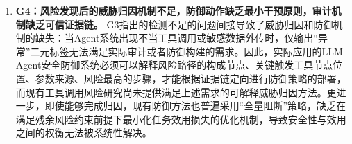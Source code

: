 \begin{enumerate}
  \item \textbf{G4：风险发现后的威胁归因机制不足，防御动作缺乏最小干预原则，审计机制缺乏可信证据链。}
  G3指出的检测不足的问题间接导致了威胁归因和防御机制的缺失：当Agent系统出现不当工具调用或敏感数据外传时，仅输出“异常”二元标签无法满足实际审计或者防御构建的需求。因此，实际应用的LLM Agent安全防御系统必须可以解释风险路径的构成节点、关键触发工具节点位置、参数来源、风险最高的步骤，才能根据证据链定向进行防御策略的部署，而现有工具调用风险研究\cite{he2025sentinelagent,wang2026authgraph,wang2026agenttrace,li2026traces}尚未提供满足上述需求的可解释威胁归因方法。更进一步，即使能够完成归因，现有防御方法也普遍采用“全量阻断”策略，缺乏在满足残余风险约束前提下最小化任务效用损失的优化机制，导致安全性与效用之间的权衡无法被系统性解决\cite{deng2025agentsunderthreat,balunovic2024agentdojo}。

\end{enumerate}
